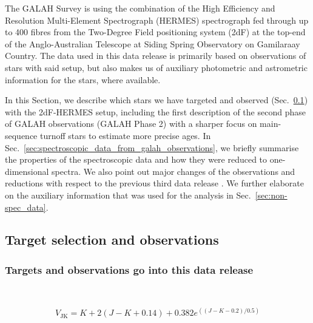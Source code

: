 \documentclass[
  journal=pasa,
  manuscript=research-paper, %
  year=2023,
  volume=37
]{cup-journal}
\begin{document}
The GALAH Survey is using the combination of the High Efficiency and Resolution Multi-Element Spectrograph (HERMES) spectrograph \citep{Sheinis2015} fed through up to 400 fibres from the Two-Degree Field positioning system (2dF) at the top-end \citep{Lewis2002} of the Anglo-Australian Telescope at Siding Spring Observatory on Gamilaraay Country. The data used in this data release is primarily based on observations of stars with said setup, but also makes us of auxiliary photometric and astrometric information for the stars, where available.

In this Section, we describe which stars we have targeted and observed (Sec.~\ref{sec:target_selection_observations}) with the 2dF-HERMES setup, including the first description of the second phase of GALAH observations (GALAH Phase 2) with a sharper focus on main-sequence turnoff stars to estimate more precise ages. In Sec.~\ref{sec:spectroscopic_data_from_galah_observations}, we briefly summarise the properties of the spectroscopic data and how they were reduced to one-dimensional spectra. We also point out major changes of the observations and reductions with respect to the previous third data release \citep{Buder2021}. We further elaborate on the auxiliary information that was used for the analysis in Sec.~\ref{sec:non-spec_data}.

\subsection{Target selection and observations} \label{sec:target_selection_observations}

\subsubsection{Targets and observations go into this data release} $\,$

\begin{equation}
V_\mathrm{JK} = K+2(J-K+0.14)+0.382e^{((J-K-0.2)/0.5)}
\end{equation}
\end{document}
